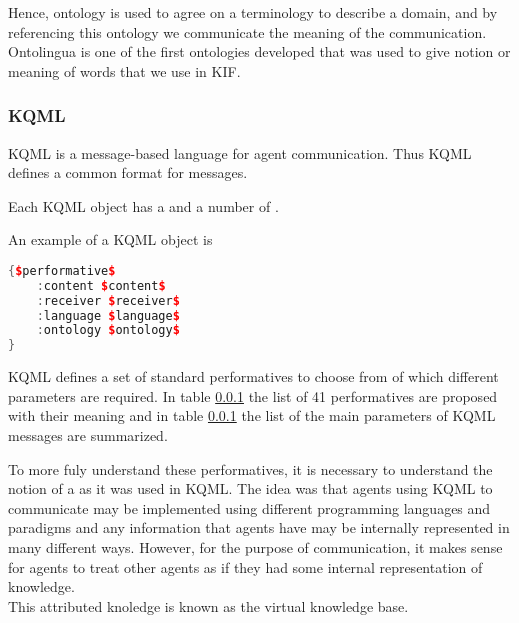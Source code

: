 Hence, ontology is used to agree on a terminology to describe a domain, and by referencing this ontology we communicate the meaning of the communication.\\
Ontolingua is one of the first ontologies developed that was used to give notion or meaning of words that we use in KIF.


\subsubsection{KQML}
KQML is a message-based language for agent communication. Thus KQML defines a common format for messages.

Each KQML object has a  and a number of .

An example of a KQML object is 

\begin{lstlisting}[language=C++]
{$performative$
	:content $content$
	:receiver $receiver$
	:language $language$
	:ontology $ontology$
}
\end{lstlisting}

KQML defines a set of standard performatives to choose from of which different parameters are required. 
In table \ref{} the list of 41 performatives are proposed with their meaning and in table \ref{} the list of the main parameters of KQML messages are summarized.


To more fuly understand these performatives, it is necessary to understand the notion of a  as it was used in KQML. The idea was that agents using KQML to communicate may be implemented using different programming languages and paradigms and any information that agents have may be internally represented in many different ways. However, for the purpose of communication, it makes sense for agents to treat other agents as if they had some internal representation of knowledge.  \\
This attributed knoledge is known as the virtual knowledge base.\\

